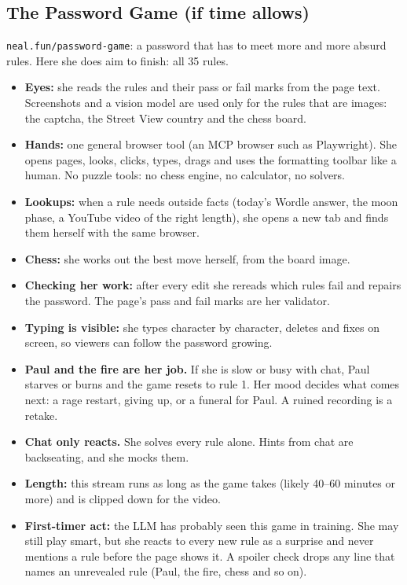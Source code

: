 \documentclass[11pt,a4paper]{article}
\begin{document}
\subsection{The Password Game (if time allows)}
\texttt{neal.fun/password-game}: a password that has to meet more and more absurd rules. Here she does aim to finish: all 35 rules.
\begin{itemize}
\item \textbf{Eyes:} she reads the rules and their pass or fail marks from the page text. Screenshots and a vision model are used only for the rules that are images: the captcha, the Street View country and the chess board.
\item \textbf{Hands:} one general browser tool (an MCP browser such as Playwright). She opens pages, looks, clicks, types, drags and uses the formatting toolbar like a human. No puzzle tools: no chess engine, no calculator, no solvers.
\item \textbf{Lookups:} when a rule needs outside facts (today's Wordle answer, the moon phase, a YouTube video of the right length), she opens a new tab and finds them herself with the same browser.
\item \textbf{Chess:} she works out the best move herself, from the board image.
\item \textbf{Checking her work:} after every edit she rereads which rules fail and repairs the password. The page's pass and fail marks are her validator.
\item \textbf{Typing is visible:} she types character by character, deletes and fixes on screen, so viewers can follow the password growing.
\item \textbf{Paul and the fire are her job.} If she is slow or busy with chat, Paul starves or burns and the game resets to rule 1. Her mood decides what comes next: a rage restart, giving up, or a funeral for Paul. A ruined recording is a retake.
\item \textbf{Chat only reacts.} She solves every rule alone. Hints from chat are backseating, and she mocks them.
\item \textbf{Length:} this stream runs as long as the game takes (likely 40--60 minutes or more) and is clipped down for the video.
\item \textbf{First-timer act:} the LLM has probably seen this game in training. She may still play smart, but she reacts to every new rule as a surprise and never mentions a rule before the page shows it. A spoiler check drops any line that names an unrevealed rule (Paul, the fire, chess and so on).
\end{itemize}
\end{document}
